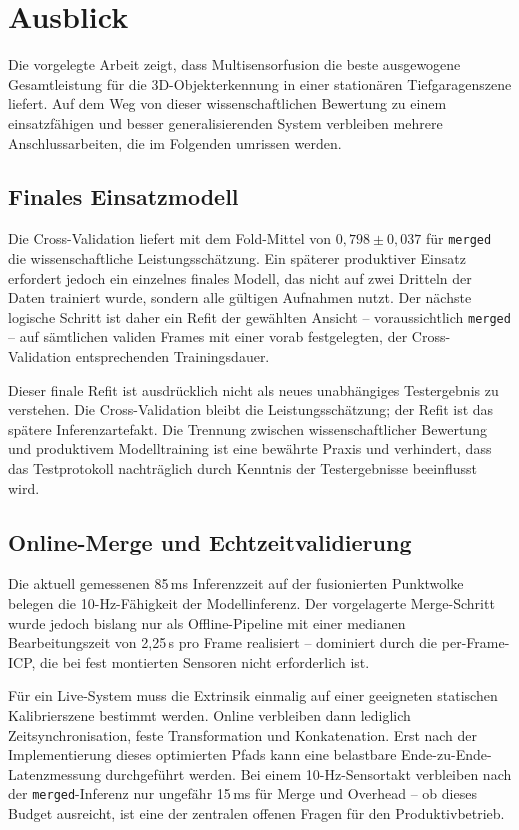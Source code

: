 \section{Ausblick}

Die vorgelegte Arbeit zeigt, dass Multisensorfusion die beste ausgewogene Gesamtleistung für die 3D-Objekterkennung in einer stationären Tiefgaragenszene liefert. Auf dem Weg von dieser wissenschaftlichen Bewertung zu einem einsatzfähigen und besser generalisierenden System verbleiben mehrere Anschlussarbeiten, die im Folgenden umrissen werden.

\subsection{Finales Einsatzmodell}

Die Cross-Validation liefert mit dem Fold-Mittel von \(0{,}798 \pm 0{,}037\) für \texttt{merged} die wissenschaftliche Leistungsschätzung. Ein späterer produktiver Einsatz erfordert jedoch ein einzelnes finales Modell, das nicht auf zwei Dritteln der Daten trainiert wurde, sondern alle gültigen Aufnahmen nutzt. Der nächste logische Schritt ist daher ein Refit der gewählten Ansicht -- voraussichtlich \texttt{merged} -- auf sämtlichen validen Frames mit einer vorab festgelegten, der Cross-Validation entsprechenden Trainingsdauer.

Dieser finale Refit ist ausdrücklich nicht als neues unabhängiges Testergebnis zu verstehen. Die Cross-Validation bleibt die Leistungsschätzung; der Refit ist das spätere Inferenzartefakt. Die Trennung zwischen wissenschaftlicher Bewertung und produktivem Modelltraining ist eine bewährte Praxis und verhindert, dass das Testprotokoll nachträglich durch Kenntnis der Testergebnisse beeinflusst wird.

\subsection{Online-Merge und Echtzeitvalidierung}

Die aktuell gemessenen 85\,ms Inferenzzeit auf der fusionierten Punktwolke belegen die 10-Hz-Fähigkeit der Modellinferenz. Der vorgelagerte Merge-Schritt wurde jedoch bislang nur als Offline-Pipeline mit einer medianen Bearbeitungszeit von 2{,}25\,s pro Frame realisiert -- dominiert durch die per-Frame-ICP, die bei fest montierten Sensoren nicht erforderlich ist.

Für ein Live-System muss die Extrinsik einmalig auf einer geeigneten statischen Kalibrierszene bestimmt werden. Online verbleiben dann lediglich Zeitsynchronisation, feste Transformation und Konkatenation. Erst nach der Implementierung dieses optimierten Pfads kann eine belastbare Ende-zu-Ende-Latenzmessung durchgeführt werden. Bei einem 10-Hz-Sensortakt verbleiben nach der \texttt{merged}-Inferenz nur ungefähr 15\,ms für Merge und Overhead -- ob dieses Budget ausreicht, ist eine der zentralen offenen Fragen für den Produktivbetrieb.

